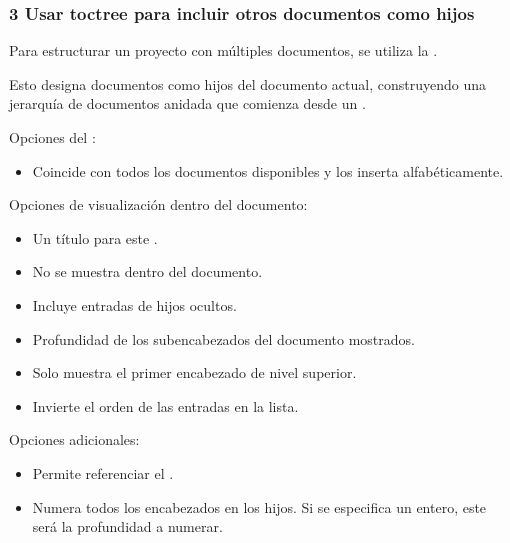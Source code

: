 \documentclass[a4paper,10pt,oneside,spanish,openany]{sphinxmanual}
\begin{document}
\subsubsection{3 Usar toctree para incluir otros documentos como hijos}
\label{\detokenize{configuracion_inicial/013.guia_de_myst_parser:usar-toctree-para-incluir-otros-documentos-como-hijos}}
\sphinxAtStartPar
Para estructurar un proyecto con múltiples documentos, se utiliza la .

\sphinxAtStartPar
Esto designa documentos como hijos del documento actual, construyendo una jerarquía de documentos anidada que comienza desde un .

\sphinxAtStartPar
Opciones del :
\begin{itemize}
\item {} 
\sphinxAtStartPar
{} Coincide con todos los documentos disponibles y los inserta alfabéticamente.

\end{itemize}

\sphinxAtStartPar
Opciones de visualización dentro del documento:
\begin{itemize}
\item {} 
\sphinxAtStartPar
{} Un título para este .

\item {} 
\sphinxAtStartPar
{} No se muestra dentro del documento.

\item {} 
\sphinxAtStartPar
{} Incluye entradas  de hijos ocultos.

\item {} 
\sphinxAtStartPar
{} Profundidad de los sub\sphinxhyphen{}encabezados del documento mostrados.

\item {} 
\sphinxAtStartPar
{} Solo muestra el primer encabezado de nivel superior.

\item {} 
\sphinxAtStartPar
{} Invierte el orden de las entradas en la lista.

\end{itemize}

\sphinxAtStartPar
Opciones adicionales:
\begin{itemize}
\item {} 
\sphinxAtStartPar
{} Permite referenciar el .

\item {} 
\sphinxAtStartPar
{} Numera todos los encabezados en los hijos. Si se especifica un entero, este será la profundidad a numerar.

\end{itemize}
\end{document}
